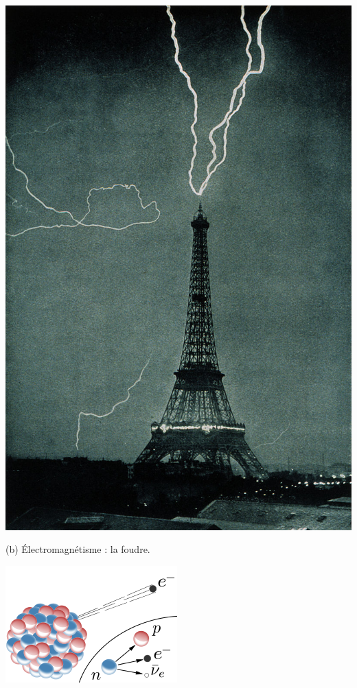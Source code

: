 {\begin{center}
\includegraphics[width=\marginparwidth]{SM/foudre.jpg}
\vspace*{-0.25cm}
\begin{center}\normalfont\small {(b) Électromagnétisme : la foudre.}\end{center}
\vspace*{-0.25cm}
\includegraphics[width=\marginparwidth]{SM/beta.png}

\end{center}}
